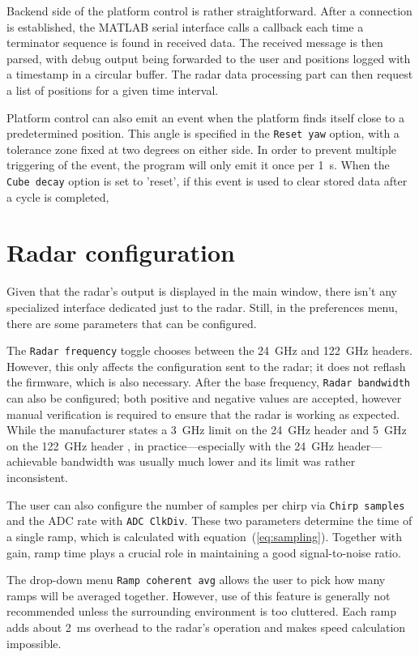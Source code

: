 Backend side of the platform control is rather straightforward.
After a connection is established, the MATLAB serial interface calls a callback each time a terminator sequence is found in received data.
The received message is then parsed, with debug output being forwarded to the user and positions logged with a timestamp in a circular buffer.
The radar data processing part can then request a list of positions for a given time interval.

Platform control can also emit an event when the platform finds itself close to a predetermined position.
This angle is specified in the \texttt{Reset yaw} option, with a tolerance zone fixed at two degrees on either side.
In order to prevent multiple triggering of the event, the program will only emit it once per 1~s.
When the \texttt{Cube decay} option is set to 'reset', if this event is used to clear stored data after a cycle is completed,

\section{Radar configuration}

Given that the radar's output is displayed in the main window, there isn't any specialized interface dedicated just to the radar.
Still, in the preferences menu, there are some parameters that can be configured.

The \texttt{Radar frequency} toggle chooses between the 24~GHz and 122~GHz headers.
However, this only affects the configuration sent to the radar; it does not reflash the firmware, which is also necessary.
After the base frequency, \texttt{Radar bandwidth} can also be configured; both positive and negative values are accepted, however manual verification is required to ensure that the radar is working as expected.
While the manufacturer states a 3~GHz limit on the 24~GHz header and 5~GHz on the 122~GHz header \cite{sidarPRO}, in practice—especially with the 24~GHz header—achievable bandwidth was usually much lower and its limit was rather inconsistent.

The user can also configure the number of samples per chirp via \texttt{Chirp samples} and the ADC rate with \texttt{ADC ClkDiv}.
These two parameters determine the time of a single ramp, which is calculated with equation~(\ref{eq:sampling}).
Together with gain, ramp time plays a crucial role in maintaining a good signal-to-noise ratio.

The drop-down menu \texttt{Ramp coherent avg} allows the user to pick how many ramps will be averaged together.
However, use of this feature is generally not recommended unless the surrounding environment is too cluttered.
Each ramp adds about 2~ms overhead to the radar's operation and makes speed calculation impossible.

